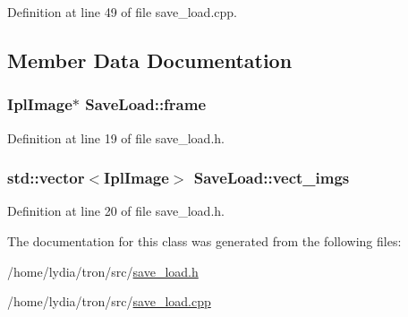 Definition at line 49 of file save\+\_\+load.\+cpp.



\subsection{Member Data Documentation}
\hypertarget{class_save_load_af29251cb2bc3db0674a6345309e190dd}{
\subsubsection[{frame}]{\setlength{\rightskip}{0pt plus 5cm}Ipl\+Image$\ast$ Save\+Load\+::frame}}\label{class_save_load_af29251cb2bc3db0674a6345309e190dd}


Definition at line 19 of file save\+\_\+load.\+h.

\hypertarget{class_save_load_a6485167b1775b2a5e48a08fa88623476}{
\subsubsection[{vect\+\_\+imgs}]{\setlength{\rightskip}{0pt plus 5cm}std\+::vector$<$Ipl\+Image$>$ Save\+Load\+::vect\+\_\+imgs}}\label{class_save_load_a6485167b1775b2a5e48a08fa88623476}


Definition at line 20 of file save\+\_\+load.\+h.



The documentation for this class was generated from the following files\+:\begin{DoxyCompactItemize}
\item 
/home/lydia/tron/src/\hyperlink{save__load_8h}{save\+\_\+load.\+h}\item 
/home/lydia/tron/src/\hyperlink{save__load_8cpp}{save\+\_\+load.\+cpp}\end{DoxyCompactItemize}
